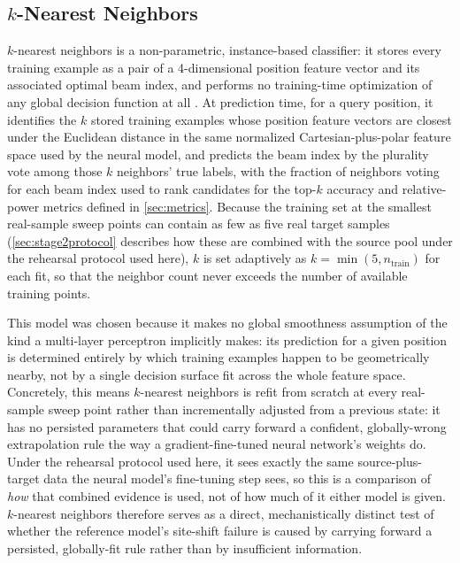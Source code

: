 \documentclass{iutbscthesis}
\begin{document}
\subsection{$k$-Nearest Neighbors}
\label{sec:knnstage2}

$k$-nearest neighbors is a non-parametric, instance-based classifier: it stores every training example as a pair of a 4-dimensional position feature vector and its associated optimal beam index, and performs no training-time optimization of any global decision function at all \cite{coverhart1967nearestneighbor}. At prediction time, for a query position, it identifies the $k$ stored training examples whose position feature vectors are closest under the Euclidean distance in the same normalized Cartesian-plus-polar feature space used by the neural model, and predicts the beam index by the plurality vote among those $k$ neighbors' true labels, with the fraction of neighbors voting for each beam index used to rank candidates for the top-$k$ accuracy and relative-power metrics defined in \autoref{sec:metrics}. Because the training set at the smallest real-sample sweep points can contain as few as five real target samples (\autoref{sec:stage2protocol} describes how these are combined with the source pool under the rehearsal protocol used here), $k$ is set adaptively as $k = \min(5, n_{\text{train}})$ for each fit, so that the neighbor count never exceeds the number of available training points.

This model was chosen because it makes no global smoothness assumption of the kind a multi-layer perceptron implicitly makes: its prediction for a given position is determined entirely by which training examples happen to be geometrically nearby, not by a single decision surface fit across the whole feature space. Concretely, this means $k$-nearest neighbors is refit from scratch at every real-sample sweep point rather than incrementally adjusted from a previous state: it has no persisted parameters that could carry forward a confident, globally-wrong extrapolation rule the way a gradient-fine-tuned neural network's weights do. Under the rehearsal protocol used here, it sees exactly the same source-plus-target data the neural model's fine-tuning step sees, so this is a comparison of \emph{how} that combined evidence is used, not of how much of it either model is given. $k$-nearest neighbors therefore serves as a direct, mechanistically distinct test of whether the reference model's site-shift failure is caused by carrying forward a persisted, globally-fit rule rather than by insufficient information.
\end{document}
